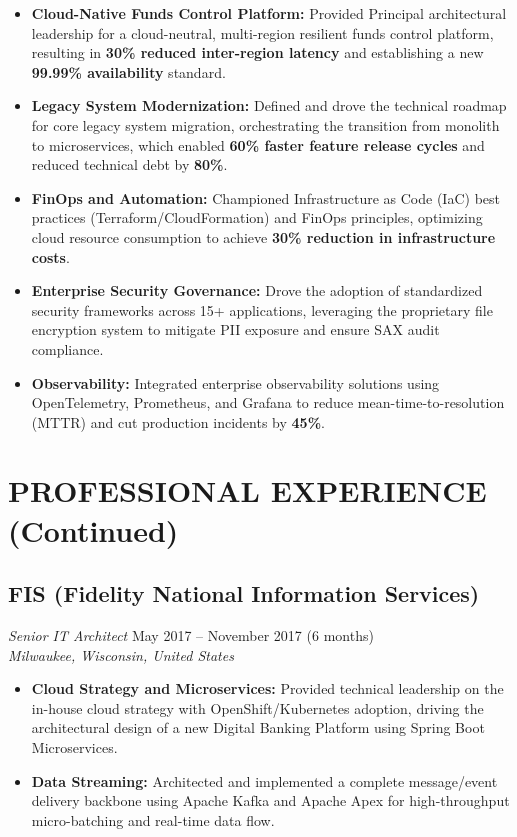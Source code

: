 \documentclass[10pt,letterpaper]{article}
\newcommand{\experience}[5]{
  \subsection*{#1}
  \textit{#2} \hfill #3\\
  \textit{#4} \hfill #5
  \vspace{2pt}
}
\begin{document}
\vspace{-2pt}
\small
\begin{itemize}[leftmargin=12pt,itemsep=2pt,topsep=2pt,parsep=0pt]
  \item \textbf{Cloud-Native Funds Control Platform:} Provided Principal architectural leadership for a cloud-neutral, multi-region resilient funds control platform, resulting in \textbf{30\% reduced inter-region latency} and establishing a new \textbf{99.99\% availability} standard.
  
  \item \textbf{Legacy System Modernization:} Defined and drove the technical roadmap for core legacy system migration, orchestrating the transition from monolith to microservices, which enabled \textbf{60\% faster feature release cycles} and reduced technical debt by \textbf{80\%}.
  
  \item \textbf{FinOps and Automation:} Championed Infrastructure as Code (IaC) best practices (Terraform/CloudFormation) and FinOps principles, optimizing cloud resource consumption to achieve \textbf{30\% reduction in infrastructure costs}.
  
  \item \textbf{Enterprise Security Governance:} Drove the adoption of standardized security frameworks across 15+ applications, leveraging the proprietary file encryption system to mitigate PII exposure and ensure SAX audit compliance.
  
  \item \textbf{Observability:} Integrated enterprise observability solutions using OpenTelemetry, Prometheus, and Grafana to reduce mean-time-to-resolution (MTTR) and cut production incidents by \textbf{45\%}.
\end{itemize}

\pagebreak

\section*{PROFESSIONAL EXPERIENCE (Continued)}

\experience
  {FIS (Fidelity National Information Services)}
  {Senior IT Architect}
  {May 2017 -- November 2017 (6 months)}
  {Milwaukee, Wisconsin, United States}
  {}

\vspace{-2pt}
\small
\begin{itemize}[leftmargin=12pt,itemsep=2pt,topsep=2pt,parsep=0pt]
  \item \textbf{Cloud Strategy and Microservices:} Provided technical leadership on the in-house cloud strategy with OpenShift/Kubernetes adoption, driving the architectural design of a new Digital Banking Platform using Spring Boot Microservices.
  
  \item \textbf{Data Streaming:} Architected and implemented a complete message/event delivery backbone using Apache Kafka and Apache Apex for high-throughput micro-batching and real-time data flow.
\end{itemize}
\end{document}
